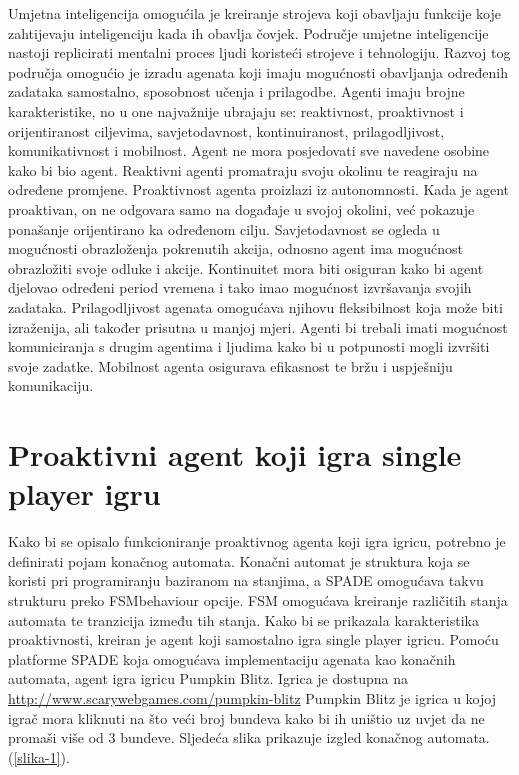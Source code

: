 \documentclass[a4paper,12pt]{foi}
\begin{document}
Umjetna inteligencija omogućila je kreiranje strojeva koji obavljaju funkcije koje zahtijevaju inteligenciju kada ih obavlja čovjek. Područje umjetne inteligencije nastoji replicirati mentalni proces ljudi koristeći strojeve i tehnologiju. Razvoj tog područja omogućio je izradu agenata koji imaju mogućnosti obavljanja određenih zadataka samostalno, sposobnost učenja i prilagodbe. Agenti imaju brojne karakteristike, no u one najvažnije ubrajaju se: reaktivnost, proaktivnost i orijentiranost ciljevima, savjetodavnost, kontinuiranost, prilagodljivost, komunikativnost i mobilnost. Agent ne mora posjedovati sve navedene osobine kako bi bio agent.
Reaktivni agenti promatraju svoju okolinu te reagiraju na određene promjene. Proaktivnost agenta proizlazi iz autonomnosti. Kada je agent proaktivan, on ne odgovara samo na događaje u svojoj okolini, već  pokazuje ponašanje orijentirano ka određenom cilju. \newline Savjetodavnost se ogleda u mogućnosti obrazloženja pokrenutih akcija, odnosno agent ima mogućnost obrazložiti svoje odluke i akcije. Kontinuitet mora biti osiguran kako bi agent djelovao određeni period vremena i tako imao mogućnost izvršavanja svojih zadataka. Prilagodljivost agenata omogućava njihovu fleksibilnost koja može biti izraženija, ali također prisutna u manjoj mjeri. Agenti bi trebali imati mogućnost komuniciranja s drugim agentima i ljudima kako bi u potpunosti mogli izvršiti svoje zadatke. Mobilnost agenta osigurava efikasnost te bržu i uspješniju komunikaciju. \citep{SchermerB2007}


\section{Proaktivni agent koji igra single player igru}
Kako bi se opisalo funkcioniranje proaktivnog agenta koji igra igricu, potrebno je definirati pojam konačnog automata. Konačni automat je struktura koja se koristi pri programiranju baziranom na stanjima, a SPADE omogućava takvu strukturu preko FSMbehaviour opcije. FSM omogućava kreiranje različitih stanja automata te tranzicija između tih stanja. \citep{Schatten2011}
\newline Kako bi se prikazala karakteristika proaktivnosti, kreiran je agent koji samostalno igra single player igricu. Pomoću platforme SPADE koja omogućava implementaciju agenata kao konačnih automata, agent igra igricu Pumpkin Blitz. Igrica je dostupna na \url{http://www.scarywebgames.com/pumpkin-blitz} Pumpkin Blitz je igrica u kojoj igrač mora kliknuti na što veći broj bundeva kako bi ih uništio uz uvjet da ne promaši više od 3 bundeve. \newline Sljedeća slika prikazuje izgled konačnog automata. (\ref{slika-1}).
\end{document}
